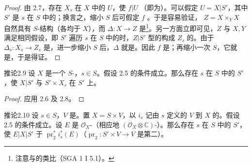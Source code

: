 \begin{proof}
由 2.7，存在 $X_s$ 在 $X$ 中的 $U$，使 $f|U$ （即为）。可以假定 $U=X|S'$，其中 $S'$ 是 $s$ 在 $S$ 中的；换言之，缩小 $S$ 后可假定 $f$ 。于是容易验证， $Z=X\times_YX$ 自然具有 $S$-结构（各均于 $X$），而 $\Delta:X\to Z$ 是\footnote{注意与的类比（SGA 1 I 5.1）。}。另一方面立即可见，$Z$ 与 $X,Y$ 满足相同假设，即 $S'$ 遍历 $s$ 在 $S$ 中的时，$Z|S'$ 型的构成 $Z_s$ 的。由于 $\Delta_s:X_s\to Z_s$ 是，进一步缩小 $S$ 后，$\Delta$ 就是。因此 $f$ 是；再缩小一次 $S$，它就是，于是得证。
\end{proof}
\begin{SGAresult}{推论}{2.9}
设 $X$ 是一个 $S$-，$s\in S$。假设 2.5 的条件成立。那么存在 $s$ 在 $S$ 中的 $S'$，使 $X|S'$ 与 $S'\times X_s$ 在 $S'$ 上。
\end{SGAresult}
\begin{proof}应用 2.6 及 2.8。\end{proof}
\begin{SGAresult}{推论}{2.10}
设 $s\in S$，$V$ 是。置 $X=S\times V$，以 $i_s$ 记由 $s$ 定义的 $V$ 到 $X$ 的。假设 2.5 的条件成立。设 $E$ 是 $\mathcal O_X$-（相应地 $(\mathcal O_X\otimes\mathbb C)$-）。那么存在 $s$ 在 $S$ 中的 $S'$，使 $E|X|S'$ 于 $\operatorname{pr}_2^*i_s^*(E)$（$\operatorname{pr}_2:S'\times V\to V$ 是第二）。
\end{SGAresult}
